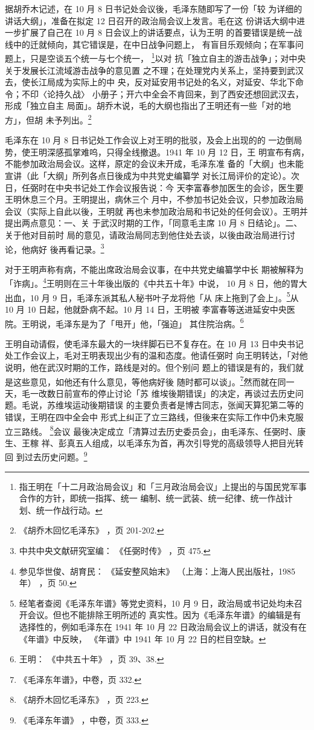 据胡乔木记述，在 10 月 8 日书记处会议後，毛泽东随即写了一份「较
为详细的讲话大纲」，准备在拟定 12 日召开的政治局会议上发言。毛在这
份讲话大纲中进一步扩展了自己在 10 月 8 日会议上的讲话要点，认为王明
的首要错误是统一战线中的迁就倾向，其它错误是，在中日战争问题上，
有盲目乐观倾向；在军事问题上，只是空谈五个统一与七个统一，
\footnote{指王明在「十二月政治局会议」和「三月政治局会议」上提出的与国民党军事合作的方针，即统一指挥、统一
编制、统一武装、统一纪律、统一作战计划、统一作战行动。
}以对
抗「独立自主的游击战争」；对中央关于发展长江流域游击战争的意见置
之不理；在处理党内关系上，坚持要到武汉去，使长江局成为实际上的中
央，反对延安用书记处的名义，对延安、华北下命令；不印〈论持久战〉
小册子；开六中全会不肯回来，到了西安还想回武汉去，形成「独立自主
局面」。胡乔木说，毛的大纲也指出了王明还有一些「对的地方」，但胡
未予列出。\footnote{《胡乔木回忆毛泽东》
，页 201-202.} 

毛泽东在 10 月 8 日书记处工作会议上对王明的批驳，及会上出现的的
一边倒局势，使王明深感孤掌难呜，只得全线撤退。1941 年 10 月 12 日，王
明宣布有病，不能参加政治局会议。这样，原定的会议未开成，毛泽东准
备的「大纲」也未能宣讲（此「大纲」所列各点日後成为中共党史编纂学
对长江局评价的定论）。次日，任弼时在中央书记处工作会议报告说：今
天李富春参加医生的会诊，医生要王明休息三个月。王明提出，病休三个
月中，不参加书记处会议，只参加政治局会议（实际上自此以後，王明就
再也未参加政治局和书记处的任何会议）。王明并提出两点意见：一、关
于武汉时期的工作，「同意毛主席 10 月 8 日结论」。二、关于他对目前时
局的意见，请政治局同志到他住处去谈，以後由政治局进行讨论，他病好
後再看记录。\footnote{中共中央文献研究室编：
《任弼时传》
，页 475.} 

对于王明声称有病，不能出席政治局会议事，在中共党史编纂学中长
期被解释为「诈病」。\footnote{参见华世俊、胡育民：
《延安整风始末》
（上海：上海人民出版社，1985 年）
，页 50.}王明则在三十年後出版的《中共五十年》中说，
10 月 8 日，他的胃大出血，10 月 9 日，毛泽东派其私人秘书叶子龙将他「从
床上拖到了会上」。\footnote{经笔者查阅《毛泽东年谱》等党史资料，10 月 9 日，政治局或书记处均未召开会议。但也不能排除王明所述的
真实性。因为《毛泽东年谱》的编辑是有选择性的，例如毛泽东在 1941 年 10 月 22 日政治局会议上的讲话，就没有在
《年谱》中反映，
《年谱》中 1941 年 10 月 22 日的栏目空缺。
}从 10 月 10 日起，他就卧病不起。10 月 14 日，王明被
李富春等送进延安中央医院。王明说，毛泽东是为了「甩开」他，「强迫」
其住院治病。\footnote{王明：
《中共五十年》
，页 39、38.}

王明自动请假，使毛泽东最大的一块绊脚石已不复存在。在 10 月 13
日中央书记处工作会议上，毛对王明表现出少有的温和态度。他请任弼时
向王明转达，「对他说明，他在武汉时期的工作，路线是对的。但个别问
题上的错误是有的，我们就是这些意见，如他还有什么意见，等他病好後
随时都可以谈」。\footnote{《毛泽东年谱》，中卷，页 332.}然而就在同一天，毛一改数日前宣布的停止讨论「苏
维埃後期错误」的决定，再谈过去历史问题。毛说，苏维埃运动後期错误
的主要负责者是博古同志，张闻天算犯第二等的错误，王明在四中全会中
形式上纠正了立三路线，但後来在实际工作中仍未克服立三路线。
\footnote{《胡乔木回忆毛泽东》
，页 223.}会议
最後决定成立「清算过去历史委员会」，由毛泽东、任弼时、康生、王稼
祥、彭真五人组成，以毛泽东为首，再次引导党的高级领导人把目光转回
到过去历史问题。\footnote{《毛泽东年谱》
，中卷，页 333.} 

